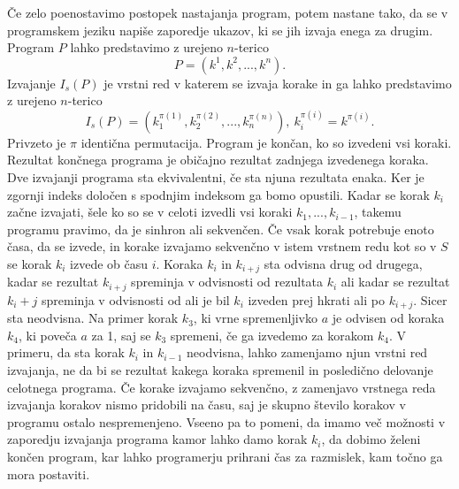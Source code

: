

Če zelo poenostavimo postopek nastajanja program, potem nastane tako, da se v programskem jeziku napiše zaporedje ukazov, ki se jih izvaja enega za drugim. Program $P$ lahko predstavimo z urejeno $n$-terico 
$$P = (k^1, k^2,..., k^n).$$ 
Izvajanje $I_s(P)$ je vrstni red v katerem se izvaja korake in ga lahko predstavimo z urejeno $n$-terico
$$I_s(P) = (k_1^{\pi(1)}, k_2^{\pi(2)},..., k_n^{\pi(n)}),\ k_i^{\pi(i)} = k^{\pi(i)}.$$
Privzeto je $\pi$ identična permutacija. Program je končan, ko so izvedeni vsi koraki. Rezultat končnega programa je običajno rezultat zadnjega izvedenega koraka. Dve izvajanji programa sta ekvivalentni, če sta njuna rezultata enaka. Ker je zgornji indeks določen s spodnjim indeksom ga bomo opustili. Kadar se korak $k_i$ začne izvajati, šele ko so se v celoti izvedli vsi koraki $k_1,...,k_{i-1}$, takemu programu pravimo, da je sinhron ali sekvenčen. Če vsak korak potrebuje enoto časa, da se izvede, in korake izvajamo sekvenčno v istem vrstnem redu kot so v $S$ se korak $k_i$ izvede ob času $i$. Koraka $k_i$ in $k_{i+j}$ sta odvisna drug od drugega, kadar se rezultat $k_{i+j}$ spreminja v odvisnosti od rezultata $k_i$ ali kadar se rezultat $k_i+j$ spreminja v odvisnosti od ali je bil $k_i$ izveden prej hkrati ali po $k_{i+j}$. Sicer sta neodvisna. Na primer korak $k_3$, ki vrne spremenljivko $a$ je odvisen od koraka $k_4$, ki poveča $a$ za 1, saj se $k_3$ spremeni, če ga izvedemo za korakom $k_4$. V primeru, da sta korak $k_i$ in $k_{i-1}$ neodvisna, lahko zamenjamo njun vrstni red izvajanja, ne da bi se rezultat kakega koraka spremenil in posledično delovanje celotnega programa.
Če korake izvajamo sekvenčno, z zamenjavo vrstnega reda izvajanja korakov nismo pridobili na času, saj je skupno število korakov v programu ostalo nespremenjeno. Vseeno pa to pomeni, da imamo več možnosti v zaporedju izvajanja programa kamor lahko damo korak $k_i$, da dobimo želeni končen program, kar lahko programerju prihrani čas za razmislek, kam točno ga mora postaviti.


